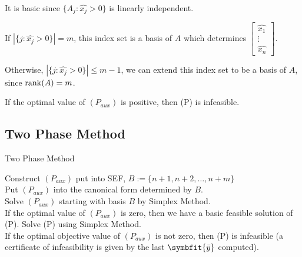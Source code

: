 It is basic since $ \{A_j : \hat{x_j}>0\} $ is linearly independent.

If $ |\{j:\hat{x_j}>0\}|=m $, this index set is a basis of $ A $ which
determines 
$ 
\begin{bmatrix}
    \hat{x_1}\\
    \vdots\\
    \hat{x_{n}}
\end{bmatrix}
$.

Otherwise, $ |\{j:\hat{x_j}>0\}|\le m-1 $, we can extend this index set
to be a basis of $ A $, since $ \operatorname{rank}(A)=m $.

If the optimal value of $ (P_{aux}) $ is positive, then (P) is
infeasible.

\subsection{Two Phase Method}
\begin{algorithm}
    \caption{Two Phase Method}
    Construct $ (P_{aux}) $ put into SEF, $ B:=\{n+1,n+2,\ldots,n+m\} $\\
    Put $ (P_{aux}) $ into the canonical form determined by $ B $.\\
    Solve $ (P_{aux}) $ starting with basis $ B $ by Simplex Method.\\
    If the optimal value of $ (P_{aux}) $ is zero, then we have a basic
    feasible solution of (P). Solve (P) using Simplex Method.\\
    If the optimal objective value of $ (P_{aux}) $ is not zero, then
    (P) is infeasible (a certificate of infeasibility is given by
    the last $ \symbfit{\bar{y}} $ computed).\\
\end{algorithm}

